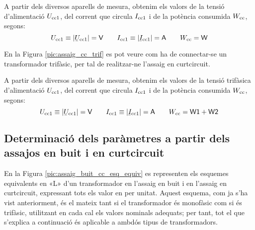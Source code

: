 A partir dels diversos aparells de mesura, obtenim els valors de la
tensió d'alimentació $U_\mathrm{cc1}$, del corrent que circula
$I_\mathrm{cc1}$ i de la potència consumida $W_\mathrm{cc}$, segons:
\begin{equation}
    U\ped{cc1}\equiv|\cmplx{U}\ped{cc1}|=\textsf{V} \qquad
    I\ped{cc1}\equiv|\cmplx{I}\ped{cc1}|=\textsf{A}
     \qquad W\ped{cc}=\textsf{W}
\end{equation}

En la Figura \vref{pic:assaig_cc_trif} es pot veure com ha de
connectar-se un transformador trifàsic, per tal de realitzar-ne l'assaig en curtcircuit.

\begin{center}
    
    \label{pic:assaig_cc_trif}
\end{center}


A partir dels diversos aparells de mesura, obtenim els valors de la
tensió trifàsica d'alimentació $U_\mathrm{cc1}$, del corrent que circula
$I_\mathrm{cc1}$ i de la potència consumida $W_\mathrm{cc}$, segons:
\begin{equation}
    U\ped{cc1}\equiv|\cmplx{U}\ped{cc1}|=\textsf{V} \qquad
    I\ped{cc1}\equiv|\cmplx{I}\ped{cc1}|=\textsf{A} \qquad
    W\ped{cc}=\textsf{W1}+\textsf{W2}
\end{equation}

\subsection{Determinació dels paràmetres a partir dels assajos en buit i en curtcircuit}

En la Figura \vref{pic:assaig_buit_cc_esq_equiv}  es representen els
esquemes equivalents en «L» d'un transformador en l'assaig en buit i
en l'assaig en curtcircuit, expressant tots els valor en per unitat.
Aquest esquema, com ja s'ha vist anteriorment, és el mateix tant si
el transformador és monofàsic com si és trifàsic, utilitzant en cada
cal els valors nominals adequats; per tant, tot el que s'explica  a
continuació és aplicable a ambdós tipus de transformadors.

\begin{center}
    
     \label{pic:assaig_buit_cc_esq_equiv}
\end{center}

